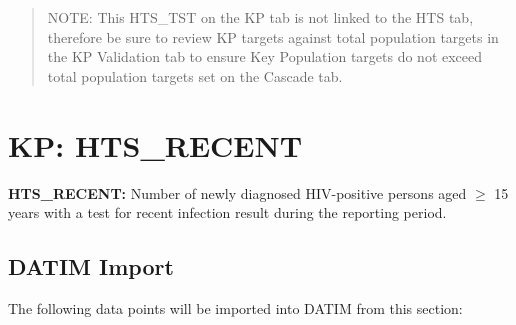 \documentclass[
  openany]{book}
\begin{document}
\begin{quote}
NOTE: This HTS\_TST on the KP tab is not linked to the HTS tab,
therefore be sure to review KP targets against total population
targets in the KP Validation tab to ensure Key Population targets do
not exceed total population targets set on the Cascade tab.
\end{quote}

\hypertarget{kp-hts_recent}{%
\section{KP: HTS\_RECENT}\label{kp-hts_recent}}

\textbf{HTS\_RECENT:} Number of newly diagnosed HIV-positive persons aged \(\geq\) 15
years with a test for recent infection result during the reporting
period.

\begin{table}
\centering\begingroup\fontsize{12}{14}\selectfont

\endgroup{}
\end{table}

\hypertarget{datim-import-40}{%
\subsection{DATIM Import}\label{datim-import-40}}

The following data points will be imported into DATIM from this section:
\end{document}
